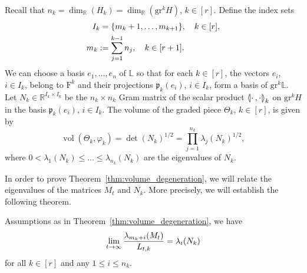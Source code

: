 \documentclass[AHL,Unicode,longabstracts]{cedram}
\newcommand{\llangle}{\mathopen{\langle\mkern -3.1mu\lvert}}
\newcommand{\rrangle}{\mathclose{\rvert\mkern -3.1mu\rangle}}
\newcommand{\highinn}[2]{{\llangle#2\rrangle_{#1}}}
\DeclareMathOperator{\vol}{vol}
\newcommand{\filter}{\mathrm{F}}
\newcommand{\R}{\mathbb{R}}
\renewcommand{\L}{\mathbb{L}}
\newcommand{\grm}[2]{\mathrm{gr}_{#1}^{#2}}
\newcommand{\proj}{\mathfrak{p}}
\renewcommand*{\to}{\mathchoice{\longrightarrow}{\rightarrow}{\rightarrow}{\rightarrow}}
\newcommand*{\Mk}{\mkern -2mu}
\newcommand*{\MK}{\mkern 2mu}
\begin{document}
Recall that $n_k = \dim_\R(H_k) = \dim_\R(\grm{}{k} H)$, $k\in [r]$. Define the index sets
\begin{align*}
I_k &= \{m_k +1, \dots, m_{k+1}\}, \quad k \in [r],\\
m_k \,\MK &\!\Mk:= \sum_{j =1}^{k-1} n_j, \quad k\in [r+1].
\end{align*}
We can choose a basis $e_1, \dots, e_n$ of $\L$ so that for each $k \in [r]$, the vectors $e_i$, $i \in I_k$, belong to $\filter^k$ and their projections $\proj_k(e_i)$, $i\in I_k$, form a basis of $\grm{}{k}\L$. Let $N_k \in \R^{I_k \times I_k}$ be the $n_k\times n_k$ Gram matrix of the scalar product $\highinn{k}{\cdot\,,\cdot}$ on $\grm{}{k}H$ in the basis $\proj_k(e_i)$, $i\in I_k$. The volume of the graded piece $\Theta_k$, $k \in [r]$, is given by
\begin{equation}\label{eq:torus_volume_matrix2}
\vol(\Theta_k, \varphi_k) = \det(N_k)^{1/2} = \prod_{j=1}^{n_k} \lambda_j(N_k)^{1/2},
\end{equation}
where $0 < \lambda_1(N_{k}) \le \dots \le \lambda_{n_k}(N_{k})$ are the eigenvalues of $N_k$.

In order to prove Theorem~\ref{thm:volume_degeneration}, we will relate the eigenvalues of the matrices $M_t$ and $N_{k}$. More precisely, we will establish the following theorem.
\begin{theo}\label{thm:limiting_eigenvalues}
Assumptions as in Theorem~\ref{thm:volume_degeneration}, we have
\begin{equation}\label{eq:limiting_eigenvalues}
\lim_{t \to \infty} \frac{\lambda_{m_k + i} (M_t)}{L_{t,k}} =\lambda_i(N_{k})
\end{equation}
for all $k \in [r]$ and any $1 \le i \le n_k$.
\end{theo}
\end{document}
